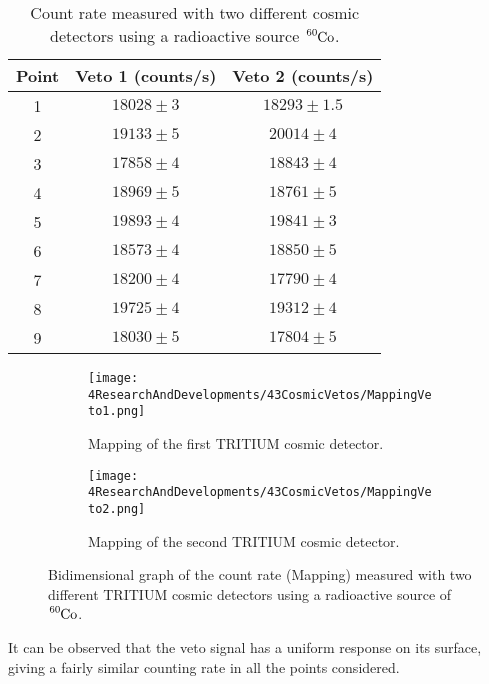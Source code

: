 \begin{enumerate}
\begin{table}[htbp]
\begin{center}
\begin{tabular}{|c|c|c|}
\hline
Point & Veto 1 (counts/s) & Veto 2 (counts/s)\\
\hline \hline \hline
1 & $18028\pm 3$ & $18293 \pm 1.5$ \\ \hline
2 & $19133 \pm 5$ & $20014 \pm 4$  \\ \hline
3 & $17858 \pm 4$ & $18843 \pm 4$  \\ \hline
4 & $18969 \pm 5$ & $18761 \pm 5$  \\ \hline
5 & $19893 \pm 4$ & $19841 \pm 3$  \\ \hline
6 & $18573 \pm 4$ & $18850 \pm 5$  \\ \hline
7 & $18200 \pm 4$ & $17790 \pm 4$  \\ \hline
8 & $19725 \pm 4$ & $19312 \pm 4$  \\ \hline
9 & $18030 \pm 5$ & $17804 \pm 5$  \\ \hline
\end{tabular}
\caption{Count rate measured with two different cosmic detectors using a radioactive source $\ce{^{60}Co}$.}
\label{tab:MappingDataVetos}
\end{center}
\end{table}

\begin{figure}
\centering
    \begin{subfigure}[b]{0.9\textwidth}
    \centering
    \texttt{[image: 4ResearchAndDevelopments/43CosmicVetos/MappingVeto1.png]}  
    \caption{Mapping of the first TRITIUM cosmic detector.\label{subfig:MappingVeto1}}
    \end{subfigure}
    \hfill
    \begin{subfigure}[b]{0.9\textwidth}
    \centering
    \texttt{[image: 4ResearchAndDevelopments/43CosmicVetos/MappingVeto2.png]}  
    \caption{Mapping of the second TRITIUM cosmic detector.\label{subfig:MappingVeto2}}
    \end{subfigure}
 \caption{Bidimensional graph of the count rate (Mapping) measured with two different TRITIUM cosmic detectors using a radioactive source of  $\ce{^{60}Co}$.}
 \label{fig:MappingVetos}
\end{figure}
It can be observed that the veto signal has a uniform response on its surface, giving a fairly similar counting rate in all the points considered.

\end{enumerate}

